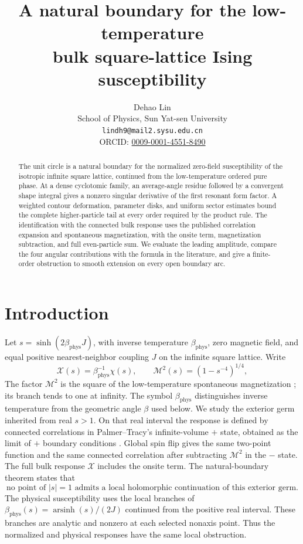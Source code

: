 \documentclass[11pt]{article}
\title{A natural boundary for the low-temperature\\
bulk square-lattice Ising susceptibility}
\author{Dehao Lin\\
\small School of Physics, Sun Yat-sen University\\
\small\texttt{lindh9@mail2.sysu.edu.cn}\\
\small ORCID: \href{https://orcid.org/0009-0001-4551-8490}{0009-0001-4551-8490}}
\date{}
\numberwithin{equation}{section}
\theoremstyle{definition}
\newcommand{\M}{\mathcal M}
\begin{document}
\maketitle

\begin{abstract}
The unit circle is a natural boundary for the normalized zero-field
susceptibility of the isotropic infinite square lattice, continued from
the low-temperature ordered pure phase. At a dense cyclotomic family,
an average-angle residue followed by a convergent shape integral gives a
nonzero singular derivative of the first resonant form factor. A weighted
contour deformation, parameter disks, and uniform sector estimates
bound the complete higher-particle tail at every order required by the
product rule. The identification with the connected bulk response uses
the published correlation expansion and spontaneous magnetization, with
the onsite term, magnetization subtraction, and full even-particle sum.
We evaluate the leading amplitude, compare the four angular
contributions with the formula in the literature, and give a finite-order
obstruction to smooth extension on every open boundary arc.
\end{abstract}

\section{Introduction}\label{sec:scope}
Let \(s=\sinh(2\beta_{\mathrm{phys}} J)\), with inverse temperature
\(\beta_{\mathrm{phys}}\), zero magnetic field, and equal positive
nearest-neighbor coupling \(J\) on the infinite square lattice. Write
\[
 \mathcal X(s)=\beta_{\mathrm{phys}}^{-1}\chi(s),\qquad
 \M^2(s)=(1-s^{-4})^{1/4},
\]
The factor \(\M^2\) is the square of the low-temperature spontaneous
magnetization \cite{Yang1952}; its branch tends to one at infinity.
The symbol \(\beta_{\mathrm{phys}}\) distinguishes inverse temperature
from the geometric angle \(\beta\) used below. We study the exterior
germ inherited from real \(s>1\). On that real interval the response is
defined by connected correlations in Palmer--Tracy's infinite-volume
\(+\) state, obtained as the limit of \(+\) boundary conditions
\cite[pp.~332, 361]{PalmerTracy1981}. Global spin flip gives the same
two-point function and the same connected correlation after subtracting
\(\M^2\) in the \(-\) state. The full bulk response \(\mathcal X\)
includes the onsite term. The natural-boundary theorem states that
\[
 \text{no point of }|s|=1\text{ admits a local holomorphic
 continuation of this exterior germ.}
\]
The physical susceptibility uses the local branches of
\(\beta_{\mathrm{phys}}(s)=\operatorname{arsinh}(s)/(2J)\) continued
from the positive real interval. These branches are analytic and nonzero
at each selected nonaxis point. Thus the normalized and physical
responses have the same local obstruction.
\end{document}
